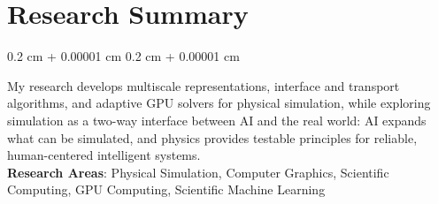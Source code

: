\documentclass[10pt, letterpaper]{article}
\newenvironment{onecolentry}{
    \begin{adjustwidth}{
        0.2 cm + 0.00001 cm
    }{
        0.2 cm + 0.00001 cm
    }
}{
    \end{adjustwidth}
} %
\newenvironment{header}{
    \setlength{\topsep}{0pt}\par\kern\topsep\centering\linespread{1.5}
}{
    \par\kern\topsep
} %
\let\hrefWithoutArrow\href
\renewcommand{\href}[2]{\hrefWithoutArrow{#1}{\ifthenelse{\equal{#2}{}}{ }{#2 }\raisebox{.15ex}{\footnotesize \faExternalLink*}}}
\begin{document}
    




    \vspace{0.3 cm - 0.3 cm}


    \section{Research Summary}

        \begin{onecolentry}
            My research develops multiscale representations, interface and transport algorithms, and adaptive GPU solvers for physical simulation, while exploring simulation as a two-way interface between AI and the real world: AI expands what can be simulated, and physics provides testable principles for reliable, human-centered intelligent systems.\\
            \textbf{Research Areas}: Physical Simulation, Computer Graphics, Scientific Computing, GPU Computing, Scientific Machine Learning
        \end{onecolentry}
\end{document}
